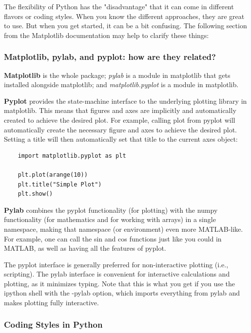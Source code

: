 The flexibility of Python has the "disadvantage" that it can come in
different flavors or coding styles. When you know the different approaches,
they are great to use. But when you get started, it can be a bit confusing.
The following section from the Matplotlib documentation may help to clarify
these things:

\subsubsection{Matplotlib, pylab, and pyplot: how are they related?}

\textbf{Matplotlib} is the whole package; \emph{pylab} is a module in matplotlib that gets installed alongside matplotlib; and \emph{matplotlib.pyplot} is a module in matplotlib.

\textbf{Pyplot} provides the state-machine interface to the underlying plotting library in matplotlib. This means that figures and axes are implicitly and automatically created to achieve the desired plot. For example, calling plot from pyplot will automatically create the necessary figure and axes to achieve the desired plot. Setting a title will then automatically set that title to the current axes object:

\begin{lstlisting}
    import matplotlib.pyplot as plt

    plt.plot(arange(10))
    plt.title("Simple Plot")
    plt.show()
\end{lstlisting}

\textbf{Pylab} combines the pyplot functionality (for plotting) with the numpy functionality (for mathematics and for working with arrays) in a single namespace, making that namespace (or environment) even more MATLAB-like. For example, one can call the sin and cos functions just like you could in MATLAB, as well as having all the features of pyplot.

The pyplot interface is generally preferred for non-interactive plotting (i.e., scripting). The pylab interface is convenient for interactive calculations and plotting, as it minimizes typing. Note that this is what you get if you use the ipython shell with the -pylab option, which imports everything from pylab and makes plotting fully interactive.


\subsubsection{Coding Styles in Python}

